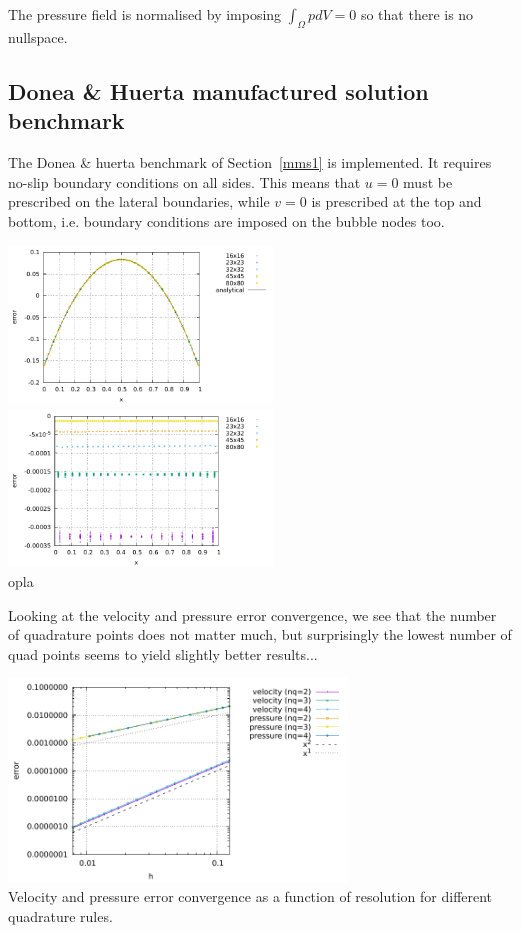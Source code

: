 The pressure field is normalised by imposing $\int_\Omega p dV=0 $ so that there is no nullspace.

\subsection*{Donea \& Huerta manufactured solution benchmark}

The Donea \& huerta benchmark of Section~\ref{mms1} is implemented. It requires 
no-slip boundary conditions on all sides. This means that $u=0$ must be 
prescribed on the lateral boundaries, while $v=0$ is prescribed at the top and bottom, 
i.e. boundary conditions are imposed on the bubble nodes too.

\begin{center}
\includegraphics[width=7cm]{python_codes/fieldstone_80/results/dh/pressure}
\includegraphics[width=7cm]{python_codes/fieldstone_80/results/dh/pressure_error}\\
{\captionfont  opla}
\end{center}


Looking at the velocity and pressure error convergence, we see that the number of quadrature
points does not matter much, but surprisingly the lowest number of quad points seems to yield slightly
better results...
\begin{center}
\includegraphics[width=9cm]{python_codes/fieldstone_80/results/dh/errors}\\
{\captionfont Velocity and pressure error convergence as a function of resolution for 
different quadrature rules.}
\end{center}


